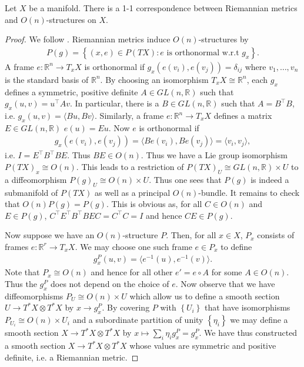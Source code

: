 \documentclass{article}
\begin{document}
\begin{theorem}\label{thm:metrics_are_structures}
  Let $X$ be a manifold. There is a 1-1 correspondence between Riemannian
  metrics and $O(n)$-structures on $X$.
  \begin{proof}
    We follow \cite{cap2021}. Riemannian metrics induce $O(n)$-structures by
    \begin{align*}
      P(g) = \left\lbrace{(x,e) \in P(TX) : \text{$e$ is orthonormal w.r.t $g_x$}}\right\rbrace.
    \end{align*}
    A frame $e:\mathbb{R}^n\to T_x X$ is orthonormal if $g_x(e(v_i),e(v_j))=\delta_{ij}$ where $v_1,\ldots,v_n$ is the standard basis of $\mathbb{R}^n$.
    By choosing an isomorphism $T_x X \cong \mathbb{R}^n$, each $g_x$ defines
    a symmetric, positive definite $A\in GL(n,\mathbb{R})$ such that $g_x(u,v)=u^\top A v$. In particular, there is a $B\in GL(n,\mathbb{R})$ such that
    $A=B^\top B$, i.e. $g_x(u,v)=\langle Bu,Bv\rangle$.
    Similarly, a frame $e:\mathbb{R}^n\to T_x X$ defines
    a matrix $E\in GL(n,\mathbb{R})$ $e(u) = Eu$. Now $e$ is orthonormal if
    \begin{align*}
      g_x(e(v_i),e(v_j)) = \langle Be(v_i), Be(v_j)\rangle = \langle v_i, v_j \rangle,
    \end{align*}
    i.e. $I=E^\top B^\top B E$. Thus $BE\in O(n)$. Thus
    we have a Lie group isomorphism $P(TX)_x \cong O(n)$. This
    leads to a restriction of $P(TX)_U \cong GL(n,\mathbb{R})\times U$
    to a diffeomorphism $P(g)_U \cong O(n)\times U$. Thus one sees that
    $P(g)$ is indeed a submanifold of $P(TX)$ as well as a principal
    $O(n)$-bundle. It remains to check that $O(n)P(g)=P(g)$. This is
    obvious as, for all $C\in O(n)$ and $E\in P(g)$,
    $C^\top E^\top B^\top BEC = C^\top C = I$ and hence $CE\in P(g)$.

    Now suppose we have an $O(n)$-structure $P$. Then, for all $x\in X$,
    $P_x$ consists of frames $e:\mathbb{R}^r\to T_x X$. We may choose
    one such frame $e\in P_x$ to define
    \begin{align*}
      g^P_x(u,v) = \langle {e}^{-1}(u),{e}^{-1}(v)\rangle.
    \end{align*}
    Note that $P_x \cong O(n)$ and hence for all other $e'=e\circ A$ for
    some $A\in O(n)$. Thus the $g^P_x$ does not depend on the choice of
    $e$. Now observe that we have diffeomorphisms $P_U \cong O(n)\times U$
    which allow us to define a smooth section $U\to T^*X\otimes T^*X$ by
    $x\to g^P_x$. By covering $P$ with $\left\lbrace{U_i}\right\rbrace$
    that have isomorphisms $P_{U_i}\cong O(n)\times U_i$ and a subordinate
    partition of unity $\left\lbrace{\eta_i}\right\rbrace$ we may define
    a smooth section $X\to T^*X \otimes T^*X$ by $x\mapsto \sum_i \eta_i g^P_x = g^P_x$.
    We have thus constructed a smooth section $X\to T^*X\otimes T^*X$ whose
    values are symmetric and positive definite, i.e. a Riemannian metric.


\end{proof}
\end{theorem}
\end{document}
